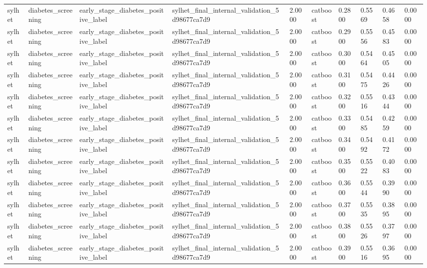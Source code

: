 \begin{tabular}{llllllllll}
sylhet & diabetes\_screening & early\_stage\_diabetes\_positive\_label & sylhet\_final\_internal\_validation\_5d98677ca7d9 & 2.0000 & catboost & 0.2800 & 0.5569 & 0.4658 & 0.0000 \\
sylhet & diabetes\_screening & early\_stage\_diabetes\_positive\_label & sylhet\_final\_internal\_validation\_5d98677ca7d9 & 2.0000 & catboost & 0.2900 & 0.5556 & 0.4583 & 0.0000 \\
sylhet & diabetes\_screening & early\_stage\_diabetes\_positive\_label & sylhet\_final\_internal\_validation\_5d98677ca7d9 & 2.0000 & catboost & 0.3000 & 0.5464 & 0.4505 & 0.0000 \\
sylhet & diabetes\_screening & early\_stage\_diabetes\_positive\_label & sylhet\_final\_internal\_validation\_5d98677ca7d9 & 2.0000 & catboost & 0.3100 & 0.5475 & 0.4426 & 0.0000 \\
sylhet & diabetes\_screening & early\_stage\_diabetes\_positive\_label & sylhet\_final\_internal\_validation\_5d98677ca7d9 & 2.0000 & catboost & 0.3200 & 0.5516 & 0.4344 & 0.0000 \\
sylhet & diabetes\_screening & early\_stage\_diabetes\_positive\_label & sylhet\_final\_internal\_validation\_5d98677ca7d9 & 2.0000 & catboost & 0.3300 & 0.5485 & 0.4259 & 0.0000 \\
sylhet & diabetes\_screening & early\_stage\_diabetes\_positive\_label & sylhet\_final\_internal\_validation\_5d98677ca7d9 & 2.0000 & catboost & 0.3400 & 0.5492 & 0.4172 & 0.0000 \\
sylhet & diabetes\_screening & early\_stage\_diabetes\_positive\_label & sylhet\_final\_internal\_validation\_5d98677ca7d9 & 2.0000 & catboost & 0.3500 & 0.5522 & 0.4083 & 0.0000 \\
sylhet & diabetes\_screening & early\_stage\_diabetes\_positive\_label & sylhet\_final\_internal\_validation\_5d98677ca7d9 & 2.0000 & catboost & 0.3600 & 0.5544 & 0.3990 & 0.0000 \\
sylhet & diabetes\_screening & early\_stage\_diabetes\_positive\_label & sylhet\_final\_internal\_validation\_5d98677ca7d9 & 2.0000 & catboost & 0.3700 & 0.5535 & 0.3895 & 0.0000 \\
sylhet & diabetes\_screening & early\_stage\_diabetes\_positive\_label & sylhet\_final\_internal\_validation\_5d98677ca7d9 & 2.0000 & catboost & 0.3800 & 0.5526 & 0.3797 & 0.0000 \\
sylhet & diabetes\_screening & early\_stage\_diabetes\_positive\_label & sylhet\_final\_internal\_validation\_5d98677ca7d9 & 2.0000 & catboost & 0.3900 & 0.5516 & 0.3695 & 0.0000 \\

\end{tabular}
